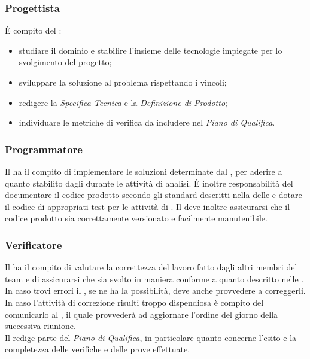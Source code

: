 \subsubsection{Progettista}
\`{E} compito del \Progettista:
\begin{itemize}
	\item studiare il dominio e stabilire l'insieme delle tecnologie impiegate per lo svolgimento del progetto;
	\item sviluppare la soluzione al problema rispettando i vincoli;
	\item redigere la \textit{Specifica Tecnica} e la \textit{Definizione di Prodotto};
	\item individuare le metriche di verifica da includere nel \textit{Piano di Qualifica}.
\end{itemize}

\subsubsection{Programmatore}
Il \Programmatore{} ha il compito di implementare le soluzioni determinate dal \Progettista, per aderire a quanto stabilito dagli \Analisti{} durante le attività di analisi. \`{E} inoltre responsabilità del \Programmatore{} documentare il codice prodotto secondo gli standard descritti nella  delle \NormeDiProgetto{} e dotare il codice di appropriati test per le attività di \VV. Il \Programmatore{} deve inoltre assicurarsi che il codice prodotto sia correttamente versionato e facilmente manutenibile.

\subsubsection{Verificatore}
Il \Verificatore{} ha il compito di valutare la correttezza del lavoro fatto dagli altri membri del team e di assicurarsi che sia svolto in maniera conforme a quanto descritto nelle \NormeDiProgetto. In caso trovi errori il \Verificatore, se ne ha la possibilità, deve anche provvedere a correggerli. In caso l'attività di correzione risulti troppo dispendiosa è compito del \Verificatore{} comunicarlo al \Responsabile, il quale provvederà ad aggiornare l'ordine del giorno della successiva riunione.\\
Il \Verificatore{} redige parte del \textit{Piano di Qualifica}, in particolare quanto concerne l'esito e la completezza delle verifiche e delle prove effettuate.
